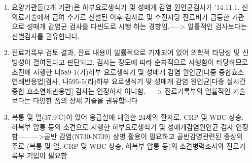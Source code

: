 {\begin{enumerate}[1.]\tightlist
\item 요양기관들(2개 기관)은 하부요로생식기 및 성매개 감염 원인균검사가 '14.11.1. 신의료기술에서 급여 수가로 신설된 이후 검사료 및 수진자당 진료비가 급등한 기관으로 성매개 감염균 검사를 다빈도로 시행 하는 경향임.-----> 일률적인 검사보다는 선별검사를 권유합니다. 
\item 진료기록부 검토 결과, 진료 내용이 일률적으로 기재되어 있어 의학적 타당성 및 신빙성이 결여된다고 판단되고, 검사는 정도에 따라 순차적으로 시행함이 타당하므로 초진에 시행한 나589-1(가)하부 요로생식기 및 성매개 감염 원인균[다중 중합효소연쇄반응법]검사, 나595-5(라)하부 요로생식기 및 성매개 감염 원인균[다중 실시간 중합 효소연쇄반응법] 검사는 인정하지 아니함. ----> 진료기록부의 일률적인 기술보다는 다양한 폼의 상세 기술을 권유합니다 
\item 복통 및 열(37.9℃)이 있어 응급실에 내원한 24세의 환자로, CRP 및 WBC 상승, 하복부 압통 등의 소견으로 시행한 하부요로생식기 및 성매개감염원인균 검사 인정함--------->골반 감염(N730-N739) 상병 활용이 필요하고 골반감영관련된 증상위주로 (복통 및 열, CRP 및 WBC 상승, 하복부 압통 등)의 소견병력조사와 진료기록부 기입이 필요함 
\end{enumerate}
}


